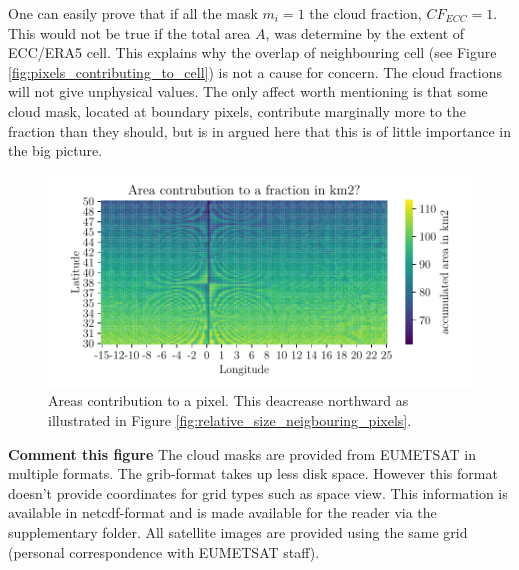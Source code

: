 One can easily prove that if all the mask $m_i = 1$ the cloud fraction, $CF_{ECC}=1$. This would not be true if the total area $A$, was determine by the extent of ECC/ERA5 cell. This explains why the overlap of neighbouring cell (see Figure \ref{fig:pixels_contributing_to_cell}) is not a cause for concern. The cloud fractions will not give unphysical values. The only affect worth mentioning is that some cloud mask, located at boundary pixels, contribute marginally more to the fraction than they should, but is in argued here that this is of little importance in the big picture.


\begin{figure}[ht]
    \centering
    \includegraphics{python_figs/signal_area_pixel.pdf}
    \caption{Areas contribution to a pixel. This deacrease northward as illustrated in Figure \ref{fig:relative_size_neigbouring_pixels}.}
    \label{fig:area_pixel_signal}
\end{figure} 
\textbf{Comment this figure}
The cloud masks are provided from EUMETSAT in multiple formats. The \acrshort{grib}-format takes up less disk space. However this format doesn't provide coordinates for grid types such as space view. This information is available in \acrshort{netcdf}-format and is made available for the reader via the supplementary folder. All satellite images are provided using the same grid (personal correspondence with EUMETSAT staff). 

